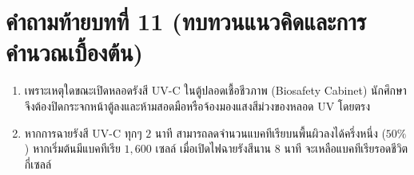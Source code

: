 \section*{คำถามท้ายบทที่ 11 (ทบทวนแนวคิดและการคำนวณเบื้องต้น)}
\begin{enumerate}
    \item เพราะเหตุใดขณะเปิดหลอดรังสี UV-C ในตู้ปลอดเชื้อชีวภาพ (Biosafety Cabinet) นักศึกษาจึงต้องปิดกระจกหน้าตู้ลงและห้ามสอดมือหรือจ้องมองแสงสีม่วงของหลอด UV โดยตรง
    \item หากการฉายรังสี UV-C ทุกๆ $2\text{ นาที}$ สามารถลดจำนวนแบคทีเรียบนพื้นผิวลงได้ครึ่งหนึ่ง ($50\%$) หากเริ่มต้นมีแบคทีเรีย $1{,}600\text{ เซลล์}$ เมื่อเปิดไฟฉายรังสีนาน $8\text{ นาที}$ จะเหลือแบคทีเรียรอดชีวิตกี่เซลล์
\end{enumerate}
